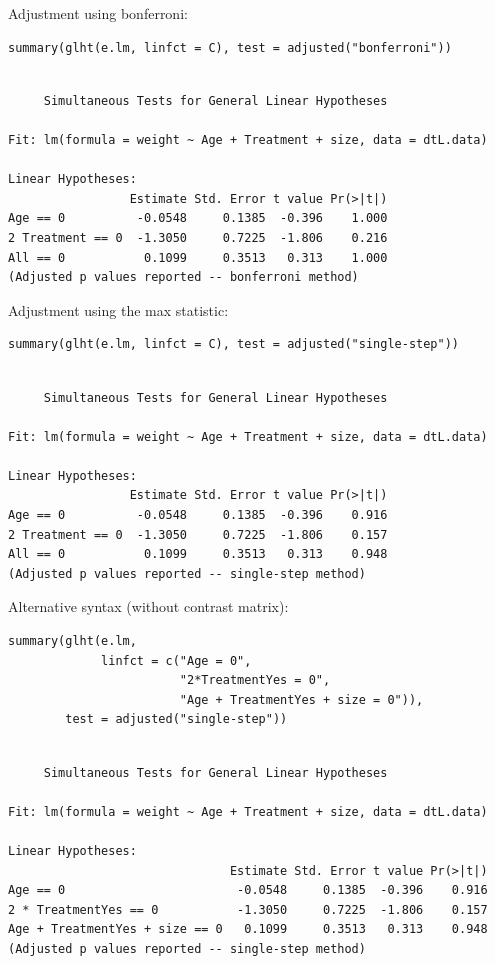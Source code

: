 \documentclass{article}
\begin{document}
Adjustment using bonferroni:
\lstset{language=r,label= ,caption= ,captionpos=b,numbers=none}
\begin{lstlisting}
summary(glht(e.lm, linfct = C), test = adjusted("bonferroni"))
\end{lstlisting}

\begin{verbatim}

	 Simultaneous Tests for General Linear Hypotheses

Fit: lm(formula = weight ~ Age + Treatment + size, data = dtL.data)

Linear Hypotheses:
                 Estimate Std. Error t value Pr(>|t|)
Age == 0          -0.0548     0.1385  -0.396    1.000
2 Treatment == 0  -1.3050     0.7225  -1.806    0.216
All == 0           0.1099     0.3513   0.313    1.000
(Adjusted p values reported -- bonferroni method)
\end{verbatim}

Adjustment using the max statistic:
\lstset{language=r,label= ,caption= ,captionpos=b,numbers=none}
\begin{lstlisting}
summary(glht(e.lm, linfct = C), test = adjusted("single-step"))
\end{lstlisting}

\begin{verbatim}

	 Simultaneous Tests for General Linear Hypotheses

Fit: lm(formula = weight ~ Age + Treatment + size, data = dtL.data)

Linear Hypotheses:
                 Estimate Std. Error t value Pr(>|t|)
Age == 0          -0.0548     0.1385  -0.396    0.916
2 Treatment == 0  -1.3050     0.7225  -1.806    0.157
All == 0           0.1099     0.3513   0.313    0.948
(Adjusted p values reported -- single-step method)
\end{verbatim}

Alternative syntax (without contrast matrix):
\lstset{language=r,label= ,caption= ,captionpos=b,numbers=none}
\begin{lstlisting}
summary(glht(e.lm, 
             linfct = c("Age = 0",
                        "2*TreatmentYes = 0",
                        "Age + TreatmentYes + size = 0")), 
        test = adjusted("single-step"))
\end{lstlisting}

\begin{verbatim}

	 Simultaneous Tests for General Linear Hypotheses

Fit: lm(formula = weight ~ Age + Treatment + size, data = dtL.data)

Linear Hypotheses:
                               Estimate Std. Error t value Pr(>|t|)
Age == 0                        -0.0548     0.1385  -0.396    0.916
2 * TreatmentYes == 0           -1.3050     0.7225  -1.806    0.157
Age + TreatmentYes + size == 0   0.1099     0.3513   0.313    0.948
(Adjusted p values reported -- single-step method)
\end{verbatim}
\end{document}
